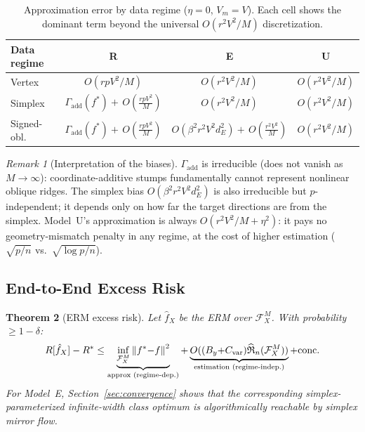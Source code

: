 \documentclass[11pt,a4paper]{article}
\newtheorem{theorem}{Theorem}[section]
\theoremstyle{definition}
\theoremstyle{remark}
\newtheorem{remark}[theorem]{Remark}
\newcommand{\Rad}{\widehat{\mathfrak{R}}_n}
\newcommand{\norm}[1]{\left\|#1\right\|}
\begin{document}
\begin{table}[t]
\centering
\caption{Approximation error by data regime
($\eta = 0$, $V_m = V$).
Each cell shows the dominant term beyond
the universal $O(r^2V^2/M)$ discretization.}
\label{tab:approx-regime}
\small
\begin{tabular}{@{}lccc@{}}
  \toprule
  Data regime & R & E & U \\
  \midrule
  Vertex
  & $O(rpV^2/M)$
  & $O(r^2V^2/M)$
  & $O(r^2V^2/M)$ \\[3pt]
  Simplex
  & $\Gamma_{\mathrm{add}}(f^*)
    {+}\,O(\frac{rpV^2}{M})$
  & $O(r^2V^2/M)$
  & $O(r^2V^2/M)$ \\[3pt]
  Signed-obl.
  & $\Gamma_{\mathrm{add}}(f^*)
    {+}\,O(\frac{rpV^2}{M})$
  & $O(\beta^2 r^2 V^2 d_E^2)
    {+}\,O(\frac{r^2V^2}{M})$
  & $O(r^2V^2/M)$ \\
  \bottomrule
\end{tabular}
\end{table}

\begin{remark}[Interpretation of the biases]
  $\Gamma_{\mathrm{add}}$ is irreducible
  (does not vanish as $M \to \infty$):
  coordinate-additive stumps fundamentally
  cannot represent nonlinear oblique ridges.
  The simplex bias
  $O(\beta^2 r^2 V^2 d_E^2)$ is also
  irreducible but $p$-independent;
  it depends only on how far the target
  directions are from the simplex.
  Model~U's approximation is always
  $O(r^2V^2/M + \eta^2)$:
  it pays no geometry-mismatch penalty in any
  regime, at the cost of higher estimation
  ($\sqrt{p/n}$ vs.\ $\sqrt{\log p/n}$).
\end{remark}


\subsection{End-to-End Excess Risk}

\begin{theorem}[ERM excess risk]
  \label{thm:excess}
  Let $\hat{f}_X$ be the ERM over
  $\mathcal{F}_X^M$.
  With probability $\ge 1{-}\delta$:
  \[
  R[\hat{f}_X] - R^*
  \le \underbrace{
  \inf_{\mathcal{F}_X^M}\norm{f^*{-}f}^2
  }_{\textup{approx (regime-dep.)}}
  + \underbrace{
  O((B_y{+}C_{\mathrm{var}})
  \Rad(\mathcal{F}_X^M))
  }_{\textup{estimation (regime-indep.)}}
  + \textup{conc.}
  \]
  For Model~E, Section~\ref{sec:convergence}
  shows that the corresponding
  simplex-parameterized infinite-width class
  optimum is algorithmically reachable by
  simplex mirror flow.
\end{theorem}
\end{document}
